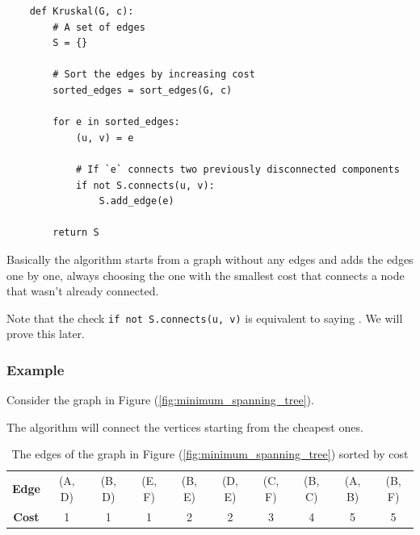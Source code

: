 \documentclass[12pt]{extarticle}
\begin{document}
\begin{verbatim}
    def Kruskal(G, c):
        # A set of edges 
        S = {}
        
        # Sort the edges by increasing cost
        sorted_edges = sort_edges(G, c)
        
        for e in sorted_edges:
            (u, v) = e

            # If `e` connects two previously disconnected components
            if not S.connects(u, v):
                S.add_edge(e)

        return S
\end{verbatim}

Basically the algorithm starts from a graph without any edges and adds the edges one by one, always choosing the one with the smallest cost that connects a node that wasn't already connected.

Note that the check \texttt{if not S.connects(u, v)} is equivalent to saying .
We will prove this later.

\subsubsection{Example}

Consider the graph in Figure (\ref{fig:minimum_spanning_tree}).

The algorithm will connect the vertices starting from the cheapest ones.

\begin{table}[H]
    \centering
    \begin{tabular}{ |c|c c c c c c c c c| }
        \hline
        \textbf{Edge} & (A, D) & (B, D) & (E, F) & (B, E) & (D, E) & (C, F) & (B, C) & (A, B) & (B, F) \\
        \textbf{Cost} & 1      & 1      & 1      & 2      & 2      & 3      & 4      & 5      & 5      \\
        \hline
    \end{tabular}
    \caption{The edges of the graph in Figure (\ref{fig:minimum_spanning_tree}) sorted by cost}
    \label{tab:kruskal_edges}
\end{table}
\end{document}
